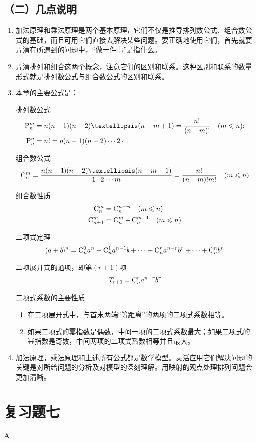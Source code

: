 \subsection*{（二）几点说明}
\begin{enumerate}
    \item 加法原理和乘法原理是两个基本原理，它们不仅是推导排列数公式、组合数公式的基础，而且可用它们直接去解决某些问题。要正确地使用它们，首先就要弄清在所遇到的问题中，“做一件事”是指什么。
    \item 弄清排列和组合这两个概念，注意它们的区别和联系。这种区别和联系的数量形式就是排列数公式与组合数公式的区别和联系。
    \item 本章的主要公式是：

    排列数公式
\[\begin{split}
 \perm{n}{m}&=n(n-1)(n-2)…(n-m+1)=\frac{n!}{(n-m)!}\quad (m\le n);\\
\perm{n}{n}&=n!=n(n-1)(n-2)\cdots 2\cdot 1   
\end{split}\]

组合数公式
\[
\comb{n}{m}=\frac{n(n-1)(n-2)…(n-m+1)}{1\cdot 2\cdots m}=\frac{n!}{(n-m)!m!}\quad (m\le n)\]

组合数性质
\[\begin{split}
    \comb{n}{m}&=\comb{n}{n-m}\quad (m\le n)\\
\comb{n+1}{m}&=\comb{n}{m}+\comb{n}{m-1}\quad (m\le n)
\end{split}\]

二项式定理
\[
(a+b)^{n}=\comb{n}{0}a^{n}+\comb{n}{1}a^{n-1}b+\cdots+\comb{n}{r}a^{n-r}b^{r}+\cdots+ \comb{n}{n}b^{n}\]

二项展开式的通项，即第$( r+1 )$项
\[
T_{r+1}=\comb{n}{r}a^{n-r}b^{r}\]


二项式系数的主要性质
\begin{enumerate}[(1)]
 \item 在二项展开式中，与首末两端“等距离”的两项的二项式系数相等。
 \item 如果二项式的幂指数是偶数，中间一项的二项式系数最大；如果二项式的幂指数是奇数，中间两项的二项式系数相等并且最大。   
\end{enumerate}


\item 加法原理，乘法原理和上述所有公式都是数学模型。灵活应用它们解决问题的关键是对所给问题的分析及对模型的深刻理解。用映射的观点处理排列问题会更加清晰。
\end{enumerate}



\section*{复习题七}
\begin{center}
    \bfseries A
\end{center}

